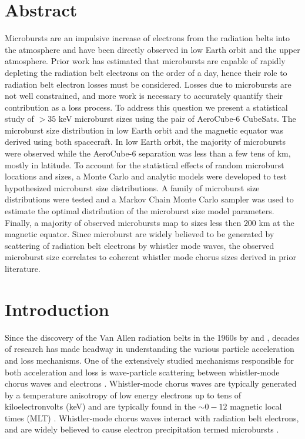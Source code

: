 \section{Abstract}
Microbursts are an impulsive increase of electrons from the radiation belts into the atmosphere and have been directly observed in low Earth orbit and the upper atmosphere. Prior work has estimated that microbursts are capable of rapidly depleting the radiation belt electrons on the order of a day, hence their role to radiation belt electron losses must be considered. Losses due to microbursts are not well constrained, and more work is necessary to accurately quantify their contribution as a loss process. To address this question we present a statistical study of $> 35$ keV microburst sizes using the pair of AeroCube-6 CubeSats. The microburst size distribution in low Earth orbit and the magnetic equator was derived using both spacecraft. In low Earth orbit, the majority of microbursts were observed while the AeroCube-6 separation was less than a few tens of km, mostly in latitude. To account for the statistical effects of random microburst locations and sizes, a Monte Carlo and analytic models were developed to test hypothesized microburst size distributions. A family of microburst size distributions were tested and a Markov Chain Monte Carlo sampler was used to estimate the optimal distribution of the microburst size model parameters. Finally, a majority of observed microbursts map to sizes less then $200$ km at the magnetic equator. Since microburst are widely believed to be generated by scattering of radiation belt electrons by whistler mode waves, the observed microburst size correlates to coherent whistler mode chorus sizes derived in prior literature.

\section{Introduction}
Since the discovery of the Van Allen radiation belts in the 1960s by \citet{Allen1959} and \citet{Vernov1960}, decades of research has made headway in understanding the various particle acceleration and loss mechanisms. One of the extensively studied mechanisms responsible for both acceleration and loss is wave-particle scattering between whistler-mode chorus waves and electrons \citep{Abel1998_1, Meredith2002, Horne2003, Thorne2005, Millan2007, Bortnik2008}. Whistler-mode chorus waves are typically generated by a temperature anisotropy of low energy electrons up to tens of kiloelectronvolts (keV) and are typically found in the $\sim 0-12$ magnetic local times (MLT) \citep{Li2009, Li2009b}. Whistler-mode chorus waves interact with radiation belt electrons, and are widely believed to cause electron precipitation termed microbursts \citep[e.g.][]{Millan2007}.

